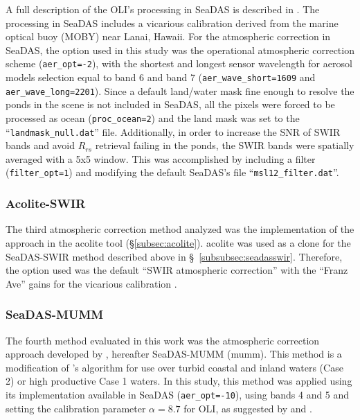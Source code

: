 A full description of the OLI's processing in SeaDAS is described in \citet{Franz:2015}. The processing in SeaDAS includes a vicarious calibration derived from the marine optical buoy (MOBY) near Lanai, Hawaii. For the atmospheric correction in SeaDAS, the option used in this study was the operational atmospheric correction scheme ({\tt aer\_opt=-2}), with the shortest and longest sensor wavelength for aerosol models selection equal to band 6 and band 7 ({\tt aer\_wave\_short=1609} and {\tt aer\_wave\_long=2201}). Since a default land/water mask fine enough to resolve the ponds in the scene is not included in SeaDAS, all the pixels were forced to be processed as ocean ({\tt proc\_ocean=2}) and the land mask was set to the ``{\tt landmask\_null.dat}'' file. Additionally, in order to increase the SNR of SWIR bands and avoid $R_{rs}$ retrieval failing in the ponds, the SWIR bands were spatially averaged with a 5x5 window. This was accomplished by including a filter ({\tt filter\_opt=1}) and modifying the default SeaDAS's file ``{\tt msl12\_filter.dat}''.
\subsubsection{Acolite-SWIR}
The third atmospheric correction method analyzed was the implementation of the \citet{Gordon:1994} approach in the \gls{acolite} tool (\S\ref{subsec:acolite}). \gls{acolite} was used as a clone for the SeaDAS-SWIR method described above in \S~\ref{subsubsec:seadasswir}. Therefore, the option used was the default ``SWIR atmospheric correction'' with the ``Franz Ave'' gains for the vicarious calibration \citep{Franz:2015}.
\subsubsection{SeaDAS-MUMM}
The fourth method evaluated in this work was the atmospheric correction approach developed by \citet{Ruddick:2000bs}, hereafter SeaDAS-MUMM (\acrfull{mumm}). This method is a modification of \citet{Gordon:1994}'s algorithm for use over turbid coastal and inland waters (Case 2) or high productive Case 1 waters. In this study, this method was applied using its implementation available in SeaDAS ({\tt aer\_opt=-10}), using bands 4 and 5 and setting the calibration parameter $\alpha=8.7$ for OLI, as suggested by \citet{Vanhellemont2014} and \citet{Vanhellemont2014a}. 


